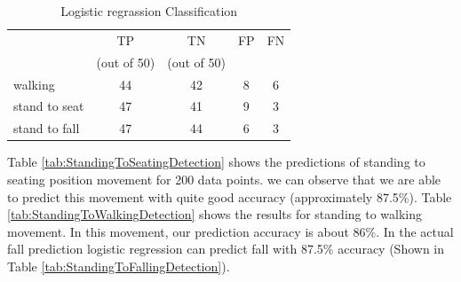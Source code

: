 \documentclass[letterpaper]{article}
\begin{document}
\begin{table}[!ht]
\caption{Logistic regrassion Classification}
	\label{tab:StandingToSeatingDetectionsvm}
	\centering
		\begin{tabular} {l |c |c |c|c}
			&TP  &	TN  &	FP &	FN \\
			&(out of 50) & (out of 50)& & \\ \hline
			walking	& 44	& 42	& 8	& 6 \\ \hline
			stand to seat	& 47	& 41	& 9 & 	3	 \\ \hline 
			stand to fall	& 47	& 44	& 6	& 3	 \\ \hline
		\end{tabular}
\end{table}


Table \ref{tab:StandingToSeatingDetection} shows the predictions of standing to seating position
movement for 200 data points. we can observe that we are able
to predict this movement with quite good accuracy (approximately 87.5\%). Table
 \ref{tab:StandingToWalkingDetection} shows the results for  standing to walking movement. In this
movement, our prediction accuracy is about 86\%. In the actual fall prediction logistic
regression can predict fall with 87.5\% accuracy (Shown in Table
 \ref{tab:StandingToFallingDetection}).
%
%
\end{document}
